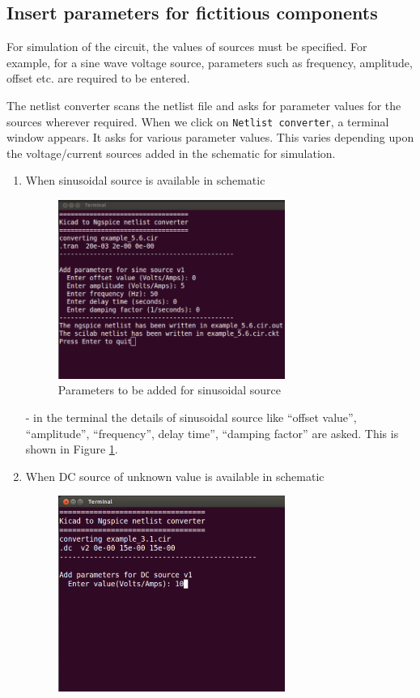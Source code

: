 \subsection{Insert parameters for fictitious components}
For simulation of the circuit, the values of sources must be specified. For example, for a sine wave voltage source, parameters such as frequency, amplitude, offset etc. are required to be 
entered.

 The netlist converter scans the netlist file and asks for parameter values for the sources wherever required. 
When we click on {\tt Netlist converter}, a terminal window appears. It asks for various parameter values. This varies depending upon the voltage/current sources added in the schematic for simulation.
\begin{enumerate}
\item When sinusoidal source  is available in schematic
\begin{figure}[t]
\centering
\includegraphics[width=0.7\textwidth]{figures/8}
\caption{Parameters to be added for sinusoidal source}
\label{8}
\end{figure}
- in the terminal the details of sinusoidal source like “offset value”, “amplitude”, “frequency”, delay time”, “damping factor” are asked. This is shown in Figure \ref{8}.
\item When DC source of unknown value is available in schematic
\begin{figure}[t]
\centering
\includegraphics[width=0.7\textwidth]{figures/9}

\end{figure}
\end{enumerate}
